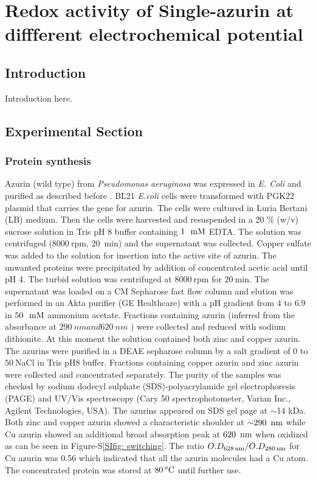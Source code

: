 \chapter{Redox activity of Single-azurin at diffferent electrochemical potential}
\graphicspath{{./chapters/c4_azurin_sm/main/}}
%  
\section{Introduction}
Introduction here.
\section{Experimental Section}
\subsection{Protein synthesis}
Azurin (wild type) from \textit{Pseudomonas aeruginosa} was expressed in \textit{E. Coli} and purified as described before \citep{kamp1990purification}. BL21 \textit{E.coli} cells were transformed with PGK22 plasmid that carries the gene for azurin. The cells were cultured in Luria Bertani (LB) medium. Then the cells were harvested and resuspended in a 20 \% (w/v) sucrose solution in Tris pH 8 buffer containing $1~\,\,\textrm{m}\textrm{M}$ EDTA. The solution was centrifuged ($8000~$rpm, 20~min) and the supernatant was collected. Copper sulfate was added to the solution for insertion into the active site of azurin. The unwanted proteins were precipitated by addition of concentrated acetic acid until pH 4. The turbid solution was centrifuged at $8000~$rpm for $20~$min. The supernatant was loaded on a CM Sepharose fast flow column and elution was performed in an Akta purifier (GE Healthcare) with a pH gradient from $4$ to $6.9$ in $50~\,\,\textrm{m}\textrm{M}$ ammonium acetate. Fractions containing azurin (inferred from the absorbance at $290~nm and 620~nm$ ) were collected and reduced with sodium dithionite. At this moment the solution contained both zinc and copper azurin. The azurins were purified in a DEAE sepharose column by a salt gradient of 0 to $50~$\mM NaCl in Tris pH8 buffer. Fractions containing copper azurin and zinc azurin were collected and concentrated separately. The purity of the samples was checked by sodium dodecyl sulphate (SDS)-polyacrylamide gel electrophoresis (PAGE) and UV/Vis spectroscopy (Cary 50 spectrophotometer, Varian Inc., Agilent Technologies, USA). The azurins appeared on SDS gel page at $\sim$14 kDa. Both zinc and copper azurin showed a characteristic shoulder at ${\sim}290~\,\textrm{nm}$ while Cu azurin showed an additional broad absorption peak at $620~\,\textrm{nm}$ when oxidized as can be seen in Figure-S\ref{SIfig: switching}. The ratio $O.D_{628\,\textrm{nm}}/O.D_{280\,\textrm{nm}}$ for Cu azurin was 0.56 which indicated that all the azurin molecules had a Cu atom. The concentrated protein was stored at $80\,^o\textrm{C}$ until further use.
